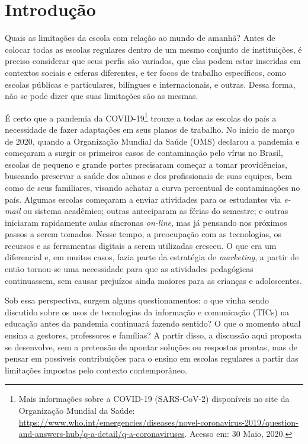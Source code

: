 \documentclass{textolivre}
\begin{document}
\begin{polyabstract}
\begin{english}
\begin{abstract}
\end{abstract}
\end{english}

\end{polyabstract}


\section{Introdução}\label{sec-intro}
Quais as limitações da escola com relação ao mundo de amanhã? Antes de colocar todas as escolas regulares dentro de um mesmo conjunto de instituições, é preciso considerar que seus perfis são variados, que elas podem estar inseridas em contextos sociais e esferas diferentes, e ter focos de trabalho específicos, como escolas públicas e particulares, bilíngues e internacionais, e outras. Dessa forma, não se pode dizer que suas limitações são as mesmas.

É certo que a pandemia da COVID-19\footnote{Mais informações sobre a COVID-19 (SARS-CoV-2) disponíveis no site da Organização Mundial da Saúde: \url{https://www.who.int/emergencies/diseases/novel-coronavirus-2019/question-and-answers-hub/q-a-detail/q-a-coronaviruses}. Acesso em: 30 Maio, 2020.} trouxe a todas as escolas do país a necessidade de fazer adaptações em seus planos de trabalho. No início de março de 2020, quando a Organização Mundial da Saúde (OMS) declarou a pandemia e começaram a surgir os primeiros casos de contaminação pelo vírus no Brasil, escolas de pequeno e grande portes precisaram começar a tomar providências, buscando preservar a saúde dos alunos e dos profissionais de suas equipes, bem como de seus familiares, visando achatar a curva percentual de contaminações no país. Algumas escolas começaram a enviar atividades para os estudantes via \textit{e-mail} ou sistema acadêmico; outras anteciparam as férias do semestre; e outras iniciaram rapidamente aulas síncronas \textit{on-line}, mas já pensando nos próximos passos a serem tomados. Nesse tempo, a preocupação com as tecnologias, os recursos e as ferramentas digitais a serem utilizadas cresceu. O que era um diferencial e, em muitos casos, fazia parte da estratégia de \textit{marketing}, a partir de então tornou-se uma necessidade para que as atividades pedagógicas continuassem, sem causar prejuízos ainda maiores para as crianças e adolescentes.

Sob essa perspectiva, surgem alguns questionamentos: o que vinha sendo discutido sobre os usos de tecnologias da informação e comunicação (TICs) na educação antes da pandemia continuará fazendo sentido? O que o momento atual ensina a gestores, professores e famílias? A partir disso, a discussão aqui proposta se desenvolve, sem a pretensão de apontar soluções ou respostas prontas, mas de pensar em possíveis contribuições para o ensino em escolas regulares a partir das limitações impostas pelo contexto contemporâneo. 
\end{document}
